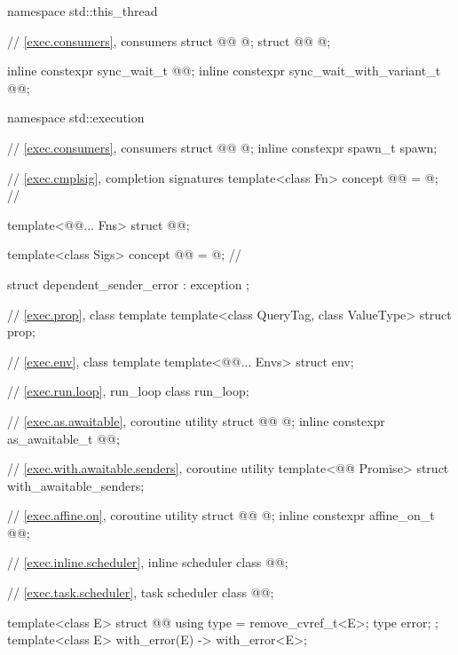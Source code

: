 \begin{codeblock}
namespace std::this_thread {
  // \ref{exec.consumers}, consumers
  struct @@ { @\unspec@ };
  struct @@ { @\unspec@ };

  inline constexpr sync_wait_t @@{};
  inline constexpr sync_wait_with_variant_t @@{};
}

namespace std::execution {
  // \ref{exec.consumers}, consumers
  struct @@ { @\unspec@ };
  inline constexpr spawn_t spawn{};

  // \ref{exec.cmplsig}, completion signatures
  template<class Fn>
    concept @@ = @\seebelownc@;                   // \expos

  template<@@... Fns>
    struct @@;

  template<class Sigs>
    concept @@ = @\seebelownc@;            // \expos

  struct dependent_sender_error : exception {};

  // \ref{exec.prop}, class template 
  template<class QueryTag, class ValueType>
    struct prop;

  // \ref{exec.env}, class template 
  template<@@... Envs>
    struct env;

  // \ref{exec.run.loop}, run_loop
  class run_loop;

  // \ref{exec.as.awaitable}, coroutine utility 
  struct @@ { @\unspec@ };
  inline constexpr as_awaitable_t @@{};

  // \ref{exec.with.awaitable.senders}, coroutine utility 
  template<@@ Promise>
    struct with_awaitable_senders;

  // \ref{exec.affine.on}, coroutine utility 
  struct @@ { @\unspec@ };
  inline constexpr affine_on_t @@{};

  // \ref{exec.inline.scheduler}, inline scheduler
  class @@;

  // \ref{exec.task.scheduler}, task scheduler
  class @@;

  template<class E>
  struct @@ {
    using type = remove_cvref_t<E>;
    type error;
  };
  template<class E>
    with_error(E) -> with_error<E>;

}
\end{codeblock}
